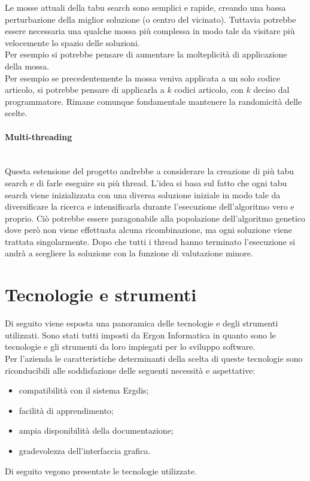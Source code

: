 Le mosse attuali della tabu search sono semplici e rapide,
creando una bassa perturbazione della miglior soluzione
(o centro del vicinato). Tuttavia potrebbe essere necessaria
una qualche mossa più complessa in modo tale da visitare
più velocemente lo spazio delle soluzioni.\\
Per esempio si potrebbe pensare di aumentare la molteplicità
di applicazione della mossa.\\ Per esempio se precedentemente
la mossa veniva applicata a un solo codice articolo, si potrebbe
pensare di applicarla a $k$ codici articolo, con $k$
deciso dal programmatore. Rimane comunque fondamentale mantenere
la randomicità delle scelte.
\vspace*{0.3cm}
\noindent \paragraph{Multi-threading}\hfill\\
Questa estensione del progetto andrebbe a considerare la
creazione di più tabu search e di farle eseguire su più thread.
L'idea si basa sul fatto che ogni tabu search viene inizializzata
con una diversa soluzione iniziale in modo tale da diversificare
la ricerca e intensificarla durante l'esecuzione dell'algoritmo
vero e proprio. Ciò potrebbe essere paragonabile alla popolazione
dell'algoritmo genetico dove però non viene effettuata alcuna
ricombinazione, ma ogni soluzione viene trattata singolarmente.
Dopo che tutti i thread hanno terminato l'esecuzione si andrà
a scegliere la soluzione con la funzione di valutazione minore.

\newpage

\section{Tecnologie e strumenti}
\label{sec:tecnologie-strumenti}

\noindent Di seguito viene esposta una panoramica delle tecnologie e degli strumenti utilizzati.
Sono stati tutti imposti da Ergon Informatica in quanto sono le tecnologie e gli strumenti
da loro impiegati per lo sviluppo software.\\
Per l’azienda le caratteristiche determinanti della scelta di queste tecnologie
sono riconducibili alle soddisfazione delle seguenti necessità e aspettative:
\begin{itemize}
    \item compatibilità con il sistema Ergdis;
    \item facilità di apprendimento;
    \item ampia disponibilità della documentazione;
    \item gradevolezza dell’interfaccia grafica.
\end{itemize}
Di seguito vegono presentate le tecnologie utilizzate.


